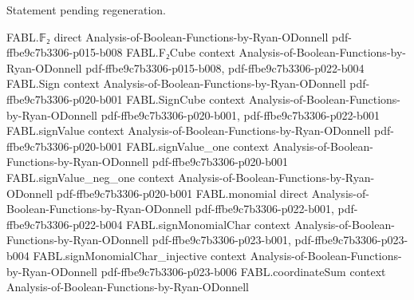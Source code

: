 \begin{theorem}
\label{FABL.eval_majorityThreeContinuationTree}
\leanok
{}
Statement pending regeneration.
\end{theorem}

\begin{theorem}
\label{FABL.queryCount_majorityThreeContinuationTree}
\leanok
{}
\proofstep
  {FABL.𝔽₂}
  {direct}
  {Analysis-of-Boolean-Functions-by-Ryan-ODonnell}
  {pdf-ffbe9c7b3306-p015-b008}
\proofstep
  {FABL.F₂Cube}
  {context}
  {Analysis-of-Boolean-Functions-by-Ryan-ODonnell}
  {pdf-ffbe9c7b3306-p015-b008,
    pdf-ffbe9c7b3306-p022-b004}
\proofstep
  {FABL.Sign}
  {context}
  {Analysis-of-Boolean-Functions-by-Ryan-ODonnell}
  {pdf-ffbe9c7b3306-p020-b001}
\proofstep
  {FABL.SignCube}
  {context}
  {Analysis-of-Boolean-Functions-by-Ryan-ODonnell}
  {pdf-ffbe9c7b3306-p020-b001,
    pdf-ffbe9c7b3306-p022-b001}
\proofstep
  {FABL.signValue}
  {context}
  {Analysis-of-Boolean-Functions-by-Ryan-ODonnell}
  {pdf-ffbe9c7b3306-p020-b001}
\proofstep
  {FABL.signValue_one}
  {context}
  {Analysis-of-Boolean-Functions-by-Ryan-ODonnell}
  {pdf-ffbe9c7b3306-p020-b001}
\proofstep
  {FABL.signValue_neg_one}
  {context}
  {Analysis-of-Boolean-Functions-by-Ryan-ODonnell}
  {pdf-ffbe9c7b3306-p020-b001}
\proofstep
  {FABL.monomial}
  {direct}
  {Analysis-of-Boolean-Functions-by-Ryan-ODonnell}
  {pdf-ffbe9c7b3306-p022-b001,
    pdf-ffbe9c7b3306-p022-b004}
\proofstep
  {FABL.signMonomialChar}
  {context}
  {Analysis-of-Boolean-Functions-by-Ryan-ODonnell}
  {pdf-ffbe9c7b3306-p023-b001,
    pdf-ffbe9c7b3306-p023-b004}
\proofstep
  {FABL.signMonomialChar_injective}
  {context}
  {Analysis-of-Boolean-Functions-by-Ryan-ODonnell}
  {pdf-ffbe9c7b3306-p023-b006}
\proofstep
  {FABL.coordinateSum}
  {context}
  {Analysis-of-Boolean-Functions-by-Ryan-ODonnell}

\end{theorem}
